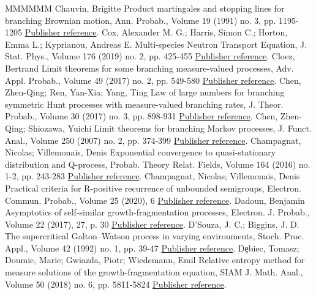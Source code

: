 \begin{thebibliography}{MMMMMM}
 Chauvin, Brigitte Product martingales and stopping lines for branching Brownian motion, Ann. Probab., Volume 19 (1991) no. 3, pp. 1195-1205 \href{https://ahl.centre-mersenne.org/item/AHL_2020__3__795_0/#Cha-stop}{Publisher reference}.
 Cox, Alexander M. G.; Harris, Simon C.; Horton, Emma L.; Kyprianou, Andreas E. Multi-species Neutron Transport Equation, J. Stat. Phys., Volume 176 (2019) no. 2, pp. 425-455 \href{https://ahl.centre-mersenne.org/item/AHL_2020__3__795_0/#CHHK}{Publisher reference}.
 Cloez, Bertrand Limit theorems for some branching measure-valued processes, Adv. Appl. Probab., Volume 49 (2017) no. 2, pp. 549-580 \href{https://ahl.centre-mersenne.org/item/AHL_2020__3__795_0/#Cloez}{Publisher reference}.
 Chen, Zhen-Qing; Ren, Yan-Xia; Yang, Ting Law of large numbers for branching symmetric Hunt processes with measure-valued branching rates, J. Theor. Probab., Volume 30 (2017) no. 3, pp. 898-931 \href{https://ahl.centre-mersenne.org/item/AHL_2020__3__795_0/#CRY}{Publisher reference}.
 Chen, Zhen-Qing; Shiozawa, Yuichi Limit theorems for branching Markov processes, J. Funct. Anal., Volume 250 (2007) no. 2, pp. 374-399 \href{https://ahl.centre-mersenne.org/item/AHL_2020__3__795_0/#ChYu}{Publisher reference}.
 Champagnat, Nicolas; Villemonais, Denis Exponential convergence to quasi-stationary distribution and Q-process, Probab. Theory Relat. Fields, Volume 164 (2016) no. 1-2, pp. 243-283 \href{https://ahl.centre-mersenne.org/item/AHL_2020__3__795_0/#ChVil}{Publisher reference}.
 Champagnat, Nicolas; Villemonais, Denis Practical criteria for R-positive recurrence of unbounded semigroups, Electron. Commun. Probab., Volume 25 (2020), 6 \href{https://ahl.centre-mersenne.org/item/AHL_2020__3__795_0/#CV-unbounded}{Publisher reference}.
 Dadoun, Benjamin Asymptotics of self-similar growth-fragmentation processes, Electron. J. Probab., Volume 22 (2017), 27, p. 30 \href{https://ahl.centre-mersenne.org/item/AHL_2020__3__795_0/#Dadoun}{Publisher reference}.
 D’Souza, J. C.; Biggins, J. D. The supercritical Galton–Watson process in varying environments, Stoch. Proc. Appl., Volume 42 (1992) no. 1, pp. 39-47 \href{https://ahl.centre-mersenne.org/item/AHL_2020__3__795_0/#DB-bpre}{Publisher reference}.
 Dȩbiec, Tomasz; Doumic, Marie; Gwiazda, Piotr; Wiedemann, Emil Relative entropy method for measure solutions of the growth-fragmentation equation, SIAM J. Math. Anal., Volume 50 (2018) no. 6, pp. 5811-5824 \href{https://ahl.centre-mersenne.org/item/AHL_2020__3__795_0/#DDGW}{Publisher reference}.

\end{thebibliography}
